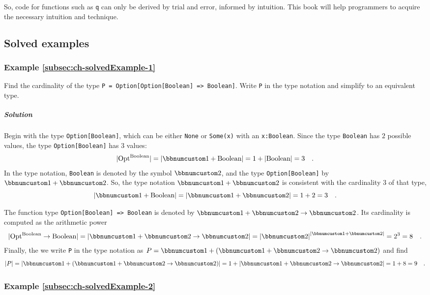 So, code for functions such as \lstinline!q! can only be derived
by trial and error, informed by intuition. This book will help programmers
to acquire the necessary intuition and technique.

\subsection{Solved examples}

\subsubsection{Example \label{subsec:ch-solvedExample-1}\ref{subsec:ch-solvedExample-1}}

Find the cardinality of the type \lstinline!P = Option[Option[Boolean] => Boolean]!.
Write \lstinline!P! in the type notation and simplify to an equivalent
type.

\subparagraph{Solution}

Begin with the type \lstinline!Option[Boolean]!, which can be either
\lstinline!None! or \lstinline!Some(x)! with an \lstinline!x:Boolean!.
Since the type \lstinline!Boolean! has $2$ possible values, the
type \lstinline!Option[Boolean]! has $3$ values:
\[
|\text{Opt}^{\text{Boolean}}|=\left|\bbnum 1+\text{Boolean}\right|=1+\left|\text{Boolean}\right|=3\quad.
\]
In the type notation, \lstinline!Boolean! is denoted by the symbol
$\bbnum 2$, and the type \lstinline!Option[Boolean]! by $\bbnum 1+\bbnum 2$.
So, the type notation $\bbnum 1+\bbnum 2$ is consistent with the
cardinality $3$ of that type,
\[
\left|\bbnum 1+\text{Boolean}\right|=\left|\bbnum 1+\bbnum 2\right|=1+2=3\quad.
\]

The function type \lstinline!Option[Boolean] => Boolean! is denoted
by $\bbnum 1+\bbnum 2\rightarrow\bbnum 2$. Its cardinality is computed
as the arithmetic power 
\[
|\text{Opt}^{\text{Boolean}}\rightarrow\text{Boolean}|=\left|\bbnum 1+\bbnum 2\rightarrow\bbnum 2\right|=\left|\bbnum 2\right|^{\left|\bbnum 1+\bbnum 2\right|}=2^{3}=8\quad.
\]
Finally, the we write \lstinline!P! in the type notation as $P=\bbnum 1+\left(\bbnum 1+\bbnum 2\rightarrow\bbnum 2\right)$
and find 
\[
\left|P\right|=\left|\bbnum 1+\left(\bbnum 1+\bbnum 2\rightarrow\bbnum 2\right)\right|=1+\left|\bbnum 1+\bbnum 2\rightarrow\bbnum 2\right|=1+8=9\quad.
\]


\subsubsection{Example \label{subsec:ch-solvedExample-2}\ref{subsec:ch-solvedExample-2}}

